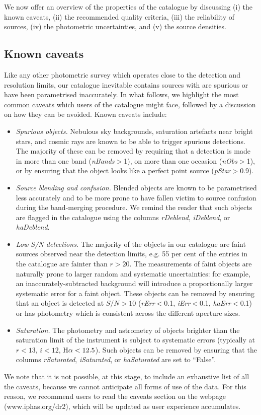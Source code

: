 \documentclass[a4paper,useAMS,usenatbib]{mn2e}
\def\ha{\mbox{H$\rm \alpha$}}
\begin{document}
{\bf

We now offer an overview of the properties of the
catalogue by discussing 
(i) the known caveats,
(ii) the recommended quality criteria,
(iii) the reliability of sources,
(iv) the photometric uncertainties,
and (v) the source densities.

\subsection{Known caveats}

Like any other photometric survey
which operates close
to the detection and resolution limits,
our catalogue inevitable contains sources
with are spurious or have been parametrised inaccurately.
In what follows, we highlight the most common
caveats which users of the catalogue might face,
followed by a discussion on how they can be avoided.
Known caveats include:
\begin{itemize}
\item \emph{Spurious objects.}
Nebulous sky backgrounds,
saturation artefacts near bright stars,
and cosmic rays
are known to be able to trigger spurious detections.
The majority of these can be removed by requiring
that a detection is made in more than one band
(\emph{nBands}$>$1),
on more than one occasion (\emph{nObs}$>$1),
or by ensuring that the object looks like a perfect
point source (\emph{pStar}$>$0.9).
\item \emph{Source blending and confusion.}
Blended objects are known to be parametrised less accurately
and to be more prone 
to have fallen victim to source confusion
during the band-merging procedure.
We remind the reader that such objects are flagged in the catalogue
using the columns \emph{rDeblend}, \emph{iDeblend},
or \emph{haDeblend}.
\item \emph{Low S/N detections.}
The majority of the objects in our catalogue
are faint sources observed near the detection limits,
e.g. 55 per cent of the entries in the catalogue
are fainter than $r > 20$.
The measurements of faint objects
are naturally prone to larger
random and systematic uncertainties:
for example, an inaccurately-subtracted background
will introduce a proportionally larger systematic error
for a faint object.
These objects can be removed by ensuring that an
object is detected at $S/N>10$
(\emph{rErr}$<$0.1, \emph{iErr}$<$0.1, \emph{haErr}$<$0.1)
or has photometry which is consistent across
the different aperture sizes.
\item \emph{Saturation.}
The photometry and astrometry of objects
brighter than the saturation limit of the instrument
is subject to systematic errors
(typically at $r<13$, $i<12$, $\ha<12.5$).
Such objects can be removed by ensuring that the columns
\emph{rSaturated}, \emph{iSaturated},
or \emph{haSaturated} are set to ``False''.
\end{itemize}
We note that it is not possible, at this stage,
to include an exhaustive list of all the caveats,
because we cannot anticipate all forms of use of the data.
For this reason, we recommend users to read
the caveats section on the webpage (www.iphas.org/dr2),
which will be updated as user experience accumulates.


}
\end{document}
